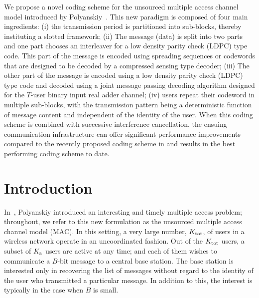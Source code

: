 \newif\iflonger
\longerfalse

\def\Figurespath{./data/MA}

We propose a novel coding scheme for the unsourced multiple access channel model introduced by Polyanskiy~\cite{polyanskiy2017perspective}.
This new paradigm is composed of four main ingredients: (i) the transmission period is partitioned into sub-blocks, thereby instituting a slotted framework; (ii) The message (data) is split into two parts and one part chooses an interleaver for a low density parity check (LDPC) type code. This part of the message is encoded using spreading sequences or codewords that are designed to be decoded by a compressed sensing type decoder; (iii) The other part of the message is encoded using a low density parity check (LDPC) type code and decoded using a joint message passing decoding algorithm designed for the $T$-user binary input real adder channel;
(iv) users repeat their codeword in multiple sub-blocks, with the transmission pattern being a deterministic function of message content and independent of the identity of the user. When this coding scheme is combined with successive interference cancellation, the ensuing communication infrastructure can offer significant performance improvements compared to the recently proposed coding scheme in \cite{ordentlich2017low} and results in the best performing coding scheme to date.

\section{Introduction}
In~\cite{polyanskiy2017perspective}, Polyanskiy introduced an interesting and timely multiple access problem; throughout, we refer to this new formulation as the unsourced multiple access channel model (MAC). In this setting, a very large number, $K_{\text{tot}}$, of users in a wireless network operate in an uncoordinated fashion. Out of the $K_{\text{tot}}$ users, a subset of $K_{\text{a}}$ users are active at any time; and each of them wishes to communicate a $B$-bit message to a central base station. The base station is interested only in recovering the list of messages without regard to the identity of the user who transmitted a particular message. In addition to this, the interest is typically in the case when $B$ is small.

